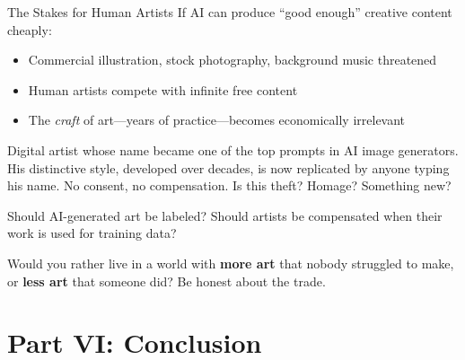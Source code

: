 ﻿\documentclass[aspectratio=169,11pt]{beamer}
\begin{document}
\begin{frame}[shrink=8]{The Stakes for Human Artists}
If AI can produce ``good enough'' creative content cheaply:
\begin{itemize}
    \item Commercial illustration, stock photography, background music threatened
    \item Human artists compete with infinite free content
    \item The \emph{craft} of art---years of practice---becomes economically irrelevant
\end{itemize}

\vspace{0.2em}
\begin{casestudybox}
\scriptsize
Digital artist whose name became one of the top prompts in AI image generators. His distinctive style, developed over decades, is now replicated by anyone typing his name. No consent, no compensation. Is this theft? Homage? Something new?
\end{casestudybox}

\vspace{0.2em}
\begin{discussionbox}
\scriptsize
Should AI-generated art be labeled? Should artists be compensated when their work is used for training data?
\end{discussionbox}

\begin{discussionbox}[Discussion]
Would you rather live in a world with \textbf{more art} that nobody struggled to make, or \textbf{less art} that someone did? Be honest about the trade.
\end{discussionbox}
\end{frame}

\section{Part VI: Conclusion}
\end{document}
